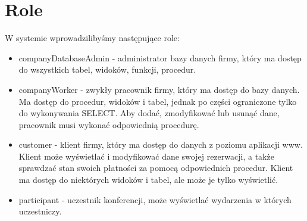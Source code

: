 \documentclass[]{article}
\begin{document}
\section{Role}
	W systemie wprowadzilibyśmy następujące role:
	\begin{itemize}
		\item companyDatabaseAdmin - administrator bazy danych firmy, który ma dostęp do wszystkich tabel, widoków, funkcji, procedur.
		\item companyWorker - zwykły pracownik firmy, który ma dostęp do bazy danych. Ma dostęp do procedur, widoków i tabel, jednak po części ograniczone tylko do wykonywania SELECT. Aby dodać, zmodyfikować lub usunąć dane, pracownik musi wykonać odpowiednią procedurę.
		\item customer - klient firmy, który ma dostęp do danych z poziomu aplikacji www. Klient może wyświetlać i modyfikować dane swojej rezerwacji, a także sprawdzać stan swoich płatności za pomocą odpowiednich procedur. Klient ma dostęp do niektórych widoków i tabel, ale może je tylko wyświetlić.
		\item participant - uczestnik konferencji, może wyświetlać wydarzenia w których uczestniczy.
	\end{itemize}
\end{document}
